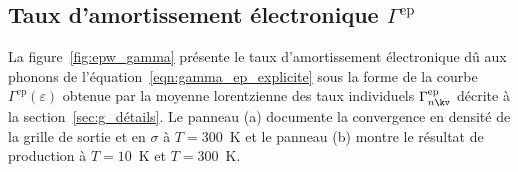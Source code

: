 \subsection{Taux d'amortissement électronique $\Gamma^\text{ep}$}\label{ssec:g_gamma_ep}

La figure~\ref{fig:epw_gamma} présente le taux d'amortissement électronique dû aux phonons de l'équation~\eqref{eqn:gamma_ep_explicite} sous la forme de la courbe $\Gamma^\text{ep}(\varepsilon)$ obtenue par la moyenne lorentzienne des taux individuels $\Gamma^\text{ep}_{n\kv}$ décrite à la section~\ref{sec:g_détails}. Le panneau (a) documente la convergence en densité de la grille de sortie et en $\sigma$ à $T=300$~K et le panneau (b) montre le résultat de production à $T=10$~K et $T=300$~K.


